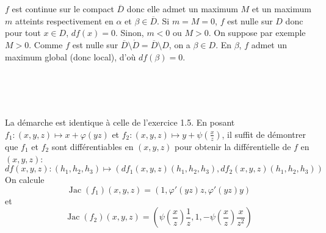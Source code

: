 \documentclass{report}
\begin{document}
\subsection{} \noindent{}\\ 
\\ 
\\
\noindent $f$ est continue sur le compact $\overline D$ donc elle admet un maximum $M$ et un maximum $m$ atteints respectivement en $\alpha$ et $\beta \in \overline D$.\newline
Si $m=M=0$, $f$ est nulle sur $D$ donc pour tout $x\in D$, $df(x)=0$.\newline
Sinon, $m<0$ ou $M>0$. On suppose par exemple $M>0$. Comme $f$ est nulle sur $\overline D\setminus \mathring D = \overline D\setminus D$, on a $\beta \in D$. En $\beta$, $f$ admet un maximum global (donc local), d'où $df(\beta)=0$. 

\subsection{} \noindent{}\\ 
\\ 
\\
\noindent La démarche est identique à celle de l'exercice 1.5. En posant $f_1:(x,y,z)\mapsto x+\varphi(yz)$ et $f_2:(x,y,z)\mapsto y+\psi(\frac xz)$, il suffit de démontrer que $f_1$ et $f_2$ sont différentiables en $(x,y,z)$ pour obtenir la différentielle de $f$ en $(x,y,z)$: $$df(x,y,z):(h_1,h_2,h_3)\mapsto (df_1(x,y,z)(h_1,h_2,h_3),df_2(x,y,z)(h_1,h_2,h_3))$$
On calcule $$\operatorname{Jac}(f_1)(x,y,z)=(1,\varphi'(yz)z,\varphi'(yz)y)$$ et $$\operatorname{Jac}(f_2)(x,y,z)=\left(\psi(\frac xz)\frac 1z,1,-\psi(\frac xz) \frac{x}{z^2} \right)$$
\end{document}
